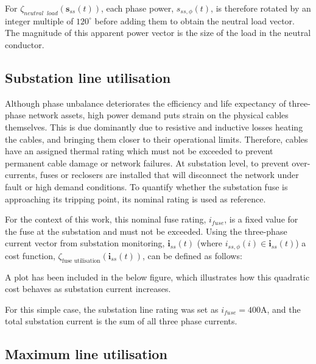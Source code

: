 

For $\zeta_{neutral\;\;load}(\textbf{s}_{ss}(t))$, each phase power, $s_{ss,\phi}(t)$, is therefore rotated by an integer multiple of $120^\circ$ before adding them to obtain the neutral load vector.
The magnitude of this apparent power vector is the size of the load in the neutral conductor.

\subsection{Substation line utilisation}
\label{ch1:subsec:substation-line-utilisation}

Although phase unbalance deteriorates the efficiency and life expectancy of three-phase network assets, high power demand puts strain on the physical cables themselves.
This is due dominantly due to resistive and inductive losses heating the cables, and bringing them closer to their operational limits.
Therefore, cables have an assigned thermal rating which must not be exceeded to prevent permanent cable damage or network failures.
At substation level, to prevent over-currents, fuses or reclosers are installed that will disconnect the network under fault or high demand conditions.
To quantify whether the substation fuse is approaching its tripping point, its nominal rating is used as reference.

For the context of this work, this nominal fuse rating, $i_{fuse}$, is a fixed value for the fuse at the substation and must not be exceeded.
Using the three-phase current vector from substation monitoring, $\textbf{i}_{ss}(t)$ (where $i_{ss,\phi}(i) \in \textbf{i}_{ss}(t)$) a cost function, $\zeta_\text{fuse utilisation}(\textbf{i}_{ss}(t))$, can be defined as follows:



A plot has been included in the below figure, which illustrates how this quadratic cost behaves as substation current increases.



For this simple case, the substation line rating was set as $i_{fuse}=400\text{A}$, and the total substation current is the sum of all three phase currents.

\subsection{Maximum line utilisation}
\label{ch1:subsec:maximum-line-utilisation}

